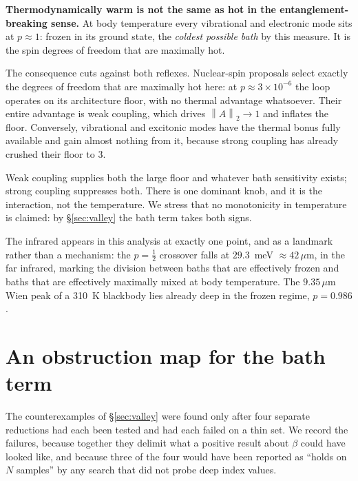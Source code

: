 \documentclass[11pt,a4paper]{article}
\theoremstyle{definition}
\theoremstyle{remark}
\newcommand{\opn}[1]{\left\lVert #1 \right\rVert_{2}}
\begin{document}
\textbf{Thermodynamically warm is not the same as hot in the entanglement-breaking sense.} At body temperature every vibrational and electronic mode sits at $p \approx 1$: frozen in its ground state, the \emph{coldest possible bath} by this measure. It is the spin degrees of freedom that are maximally hot.

The consequence cuts against both reflexes. Nuclear-spin proposals \cite{Fisher2015} select exactly the degrees of freedom that are maximally hot here: at $p \approx 3\times10^{-6}$ the loop operates on its architecture floor, with no thermal advantage whatsoever. Their entire advantage is weak coupling, which drives $\opn{A} \to 1$ and inflates the floor. Conversely, vibrational and excitonic modes have the thermal bonus fully available and gain almost nothing from it, because strong coupling has already crushed their floor to $3$.

\begin{center}
\end{center}

Weak coupling supplies both the large floor and whatever bath sensitivity exists; strong coupling suppresses both. There is one dominant knob, and it is the interaction, not the temperature. We stress that no monotonicity in temperature is claimed: by \S\ref{sec:valley} the bath term takes both signs.

The infrared appears in this analysis at exactly one point, and as a landmark rather than a mechanism: the $p = \tfrac12$ crossover falls at $29.3$~meV $\approx 42\,\mu$m, in the far infrared, marking the division between baths that are effectively frozen and baths that are effectively maximally mixed at body temperature. The $9.35\,\mu$m Wien peak of a 310~K blackbody lies already deep in the frozen regime, $p = 0.986$.

\section{An obstruction map for the bath term}\label{sec:obstruction}

The counterexamples of \S\ref{sec:valley} were found only after four separate reductions had each been tested and had each failed on a thin set. We record the failures, because together they delimit what a positive result about $\beta$ could have looked like, and because three of the four would have been reported as ``holds on $N$ samples'' by any search that did not probe deep index values.
\end{document}
